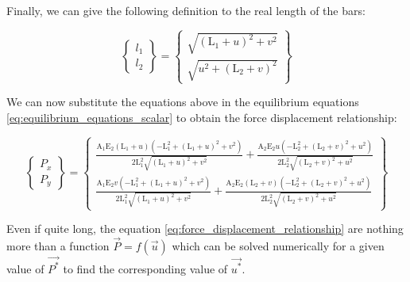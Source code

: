 Finally, we can give the following definition to the real length of the bars:

\begin{equation}
    \begin{Bmatrix}
        l_1 \\
        l_2
    \end{Bmatrix}
    =
    \begin{Bmatrix}
        \sqrt{(\text{L}_1+u)^2+v^2} \\
        \sqrt{u^2+(\text{L}_2+v)^2}
    \end{Bmatrix}
    \label{eq:real_length}
\end{equation}

We can now substitute the equations above in the equilibrium equations \ref{eq:equilibrium_equations_scalar} to obtain the force displacement relationship:

\begin{equation}
    \begin{Bmatrix}
        P_x \\
        P_y
    \end{Bmatrix}
    =
    \begin{Bmatrix}
        \frac{\text{A}_1 \text{E}_2 (\text{L}_1+u) \left(-\text{L}_1^2+(\text{L}_1+u)^2+v^2\right)}{2 \text{L}_1^2 \sqrt{(\text{L}_1+u)^2+v^2}}+\frac{\text{A}_2 \text{E}_2 u \left(-\text{L}_2^2+(\text{L}_2+v)^2+u^2\right)}{2 \text{L}_2^2 \sqrt{(\text{L}_2+v)^2+u^2}} \\
        \frac{\text{A}_1 \text{E}_2 v \left(-\text{L}_1^2+(\text{L}_1+u)^2+v^2\right)}{2 \text{L}_1^2 \sqrt{(\text{L}_1+u)^2+v^2}}+\frac{\text{A}_2 \text{E}_2 (\text{L}_2+v) \left(-\text{L}_2^2+(\text{L}_2+v)^2+u^2\right)}{2 \text{L}_2^2 \sqrt{(\text{L}_2+v)^2+u^2}}
    \end{Bmatrix}
    \label{eq:force_displacement_relationship}
\end{equation}

Even if quite long, the equation \ref{eq:force_displacement_relationship} are nothing more than a function ${\vec{P}} = f({\vec{u}})$ which can be solved numerically for a given value of ${\vec{P^*}}$ to find the corresponding value of ${\vec{u^*}}$.
